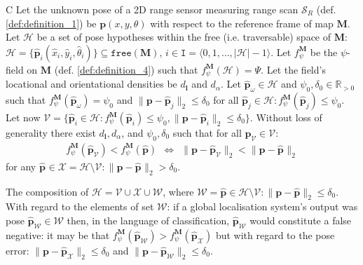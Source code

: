 \begin{customcnj}{C}
  \label{cnj:conjecture_c}
  Let the unknown pose of a 2D range sensor measuring range scan $\mathcal{S}_R$
  (def. \ref{def:definition_1}) be $\bm{p}(x,y,\theta)$ with respect to the
  reference frame of map $\bm{M}$.
  Let $\mathcal{H}$ be a set of pose hypotheses within the free (i.e.
  traversable) space of $\bm{M}$:
  $\mathcal{H} = \{\hat{\bm{p}}_i(\hat{x}_i,\hat{y}_i,\hat{\theta}_i)\} \subseteq \texttt{free}(\bm{M})$,
  $i \in \texttt{I} = \langle 0,1,\dots,|\mathcal{H}|-1\rangle$.
  Let $f_{\psi}^{\bm{M}}$ be the $\psi$-field on $\bm{M}$
  (def. \ref{def:definition_4}) such that $f_{\psi}^{\bm{M}}(\mathcal{H})= \Psi$.
  Let the field's locational and orientational densities be
  $d_{\bm{l}}$ and $d_{\alpha}$.
  Let $\hat{\bm{p}}_\omega \in \mathcal{H}$ and $\psi_0,\delta_0 \in \mathbb{R}_{>0}$
  such that $f_{\psi}^{\bm{M}}(\hat{\bm{p}}_\omega ) = \psi_0$ and
  $\|\bm{p}-\hat{\bm{p}}_j\|_2 \leq \delta_0$ for all
  $\hat{\bm{p}}_j \in \mathcal{H}: f_{\psi}^{\bm{M}}(\hat{\bm{p}}_j) \leq \psi_0$.
  Let now $\mathcal{V} = \{\hat{\bm{p}}_i \in \mathcal{H}: f_{\psi}^{\bm{M}}(\hat{\bm{p}}_i) \leq \psi_0,
  \|\bm{p}-\hat{\bm{p}}_i\|_2 \leq \delta_0\}$.
  Without loss of generality there exist $d_{\bm{l}}, d_{\alpha}$, and
  $\psi_0,\delta_0$ such that for all
  $\hat{\bm{p}}_\mathcal{V} \in \mathcal{V}$:
  \begin{align}
    f_{\psi}^{\bm{M}}(\hat{\bm{p}}_\mathcal{V}) < f_{\psi}^{\bm{M}}(\hat{\bm{p}}) \ \ \Leftrightarrow \ \
    \|\bm{p}-\hat{\bm{p}}_\mathcal{V}\|_2 < \|\bm{p}-\hat{\bm{p}}_{}\|_2 \nonumber
  \end{align}
  for any $\hat{\bm{p}}_{} \in \mathcal{X} = \mathcal{H} \setminus  \mathcal{V}: \|\bm{p}-\hat{\bm{p}}_{}\|_2 > \delta_0$.
\end{customcnj}

\begin{remark}
  \label{rem:remark_1}
  The composition of
  $\mathcal{H} = \mathcal{V} \cup \mathcal{X} \cup \mathcal{W}$, where
  $\mathcal{W} = \hat{\bm{p}} \in {\mathcal{H} \setminus \mathcal{V}}: \|\bm{p}-\hat{\bm{p}}\|_2 \leq \delta_0$.
  With regard to the elements of set $\mathcal{W}$: if a global localisation
  system's output was pose
  $\hat{\bm{p}}_{\mathcal{W}} \in \mathcal{W}$ then, in the language of
  classification, $\hat{\bm{p}}_{\mathcal{W}}$ would constitute a false
  negative: it may be that
  $f_{\psi}^{\bm{M}}(\hat{\bm{p}}_{\mathcal{W}}) > f_{\psi}^{\bm{M}}(\hat{\bm{p}}_{\mathcal{X}})$
  but with regard to the pose error:
  $\|\bm{p}-\hat{\bm{p}}_{\mathcal{X}}\|_2 \leq \delta_0$ and
  $\|\bm{p}-\hat{\bm{p}}_{\mathcal{W}}\|_2 \leq \delta_0$.
\end{remark}

